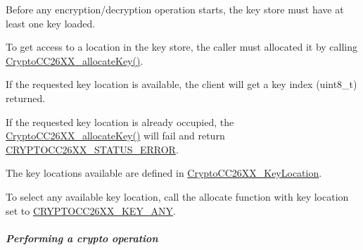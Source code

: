 \begin{DoxyItemize}
\item Before any encryption/decryption operation starts, the key store must have at least one key loaded.
\item To get access to a location in the key store, the caller must allocated it by calling \hyperlink{_crypto_c_c26_x_x_8h_a50d5828043e87fd37398d2aabe9b9e92}{Crypto\+C\+C26\+X\+X\+\_\+allocate\+Key()}.
\item If the requested key location is available, the client will get a key index (uint8\+\_\+t) returned.
\item If the requested key location is already occupied, the \hyperlink{_crypto_c_c26_x_x_8h_a50d5828043e87fd37398d2aabe9b9e92}{Crypto\+C\+C26\+X\+X\+\_\+allocate\+Key()} will fail and return \hyperlink{_crypto_c_c26_x_x_8h_a077508dd42d5999244911edc61f63194}{C\+R\+Y\+P\+T\+O\+C\+C26\+X\+X\+\_\+\+S\+T\+A\+T\+U\+S\+\_\+\+E\+R\+R\+O\+R}.
\item The key locations available are defined in \hyperlink{_crypto_c_c26_x_x_8h_a5266637af2c4ac36ed58d4e0f158b706}{Crypto\+C\+C26\+X\+X\+\_\+\+Key\+Location}.
\item To select any available key location, call the allocate function with key location set to \hyperlink{_crypto_c_c26_x_x_8h_a5266637af2c4ac36ed58d4e0f158b706a335a9c94549f0e882296bd43ccb4f953}{C\+R\+Y\+P\+T\+O\+C\+C26\+X\+X\+\_\+\+K\+E\+Y\+\_\+\+A\+N\+Y}.
\end{DoxyItemize}\subparagraph*{Performing a crypto operation}


